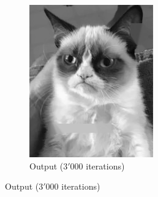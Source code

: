\documentclass{paper}
\begin{document}
\begin{figure}[H]
\begin{subfigure}[ht]{0.45\textwidth}
	\includegraphics[width=\textwidth]{result-cat-lambda100-theta0_5-iter3000}
	\caption*{Output ($3'000$ iterations)}
\end{subfigure}


\end{figure}
\end{document}
